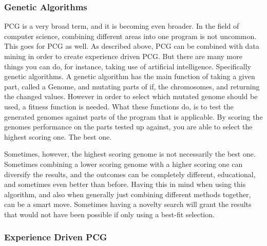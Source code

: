 \subsubsection{Genetic Algorithms}
PCG is a very broad term, and it is becoming even broader. In the field of computer science, combining different areas into one program is not uncommon. This goes for PCG as well. As described above, PCG can be combined with data mining in order to create experience driven PCG. But there are many more things you can do, for instance, taking use of artificial intelligence. Specifically genetic algorithms. A genetic algorithm has the main function of taking a given part, called a Genome, and mutating parts of if, the chromosomes, and returning the changed values. However in order to select which mutated genome should be used, a fitness function is needed. What these functions do, is to test the generated genomes against parts of the program that is applicable. By scoring the genomes performance on the parts tested up against, you are able to select the highest scoring one. The best one. 

Sometimes, however, the highest scoring genome is not necessarily the best one. Sometimes combining a lower scoring genome with a higher scoring one can diversify the results, and the outcomes can be completely different, educational, and sometimes even better than before. Having this in mind when using this algorithm, and also when generally just combining different methods together, can be a smart move. Sometimes having a novelty search will grant the results that would not have been possible if only using a best-fit selection.
\subsubsection{Experience Driven PCG}


